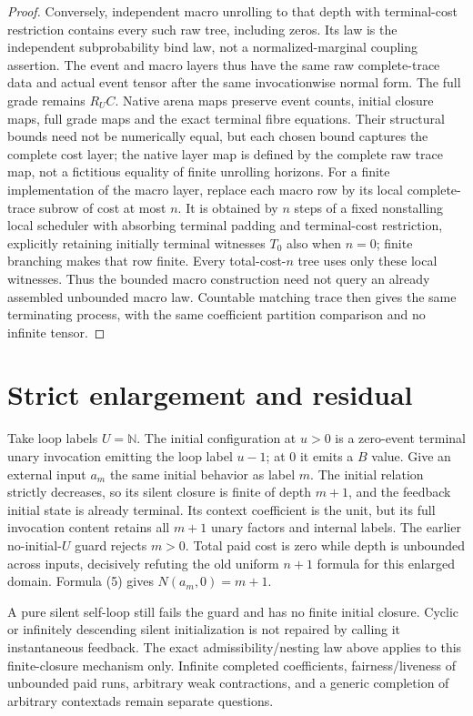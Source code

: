 \documentclass[11pt]{article}
\begin{document}
\begin{proof}
Conversely, independent macro unrolling to that depth with terminal-cost restriction contains every such raw tree, including zeros. Its law is the independent subprobability bind law, not a normalized-marginal coupling assertion. The event and macro layers thus have the same raw complete-trace data and actual event tensor after the same invocationwise normal form. The full grade remains $R_UC$. Native arena maps preserve event counts, initial closure maps, full grade maps and the exact terminal fibre equations. Their structural bounds need not be numerically equal, but each chosen bound captures the complete cost layer; the native layer map is defined by the complete raw trace map, not a fictitious equality of finite unrolling horizons. For a finite implementation of the macro layer, replace each macro row by its local complete-trace subrow of cost at most $n$. It is obtained by $n$ steps of a fixed nonstalling local scheduler with absorbing terminal padding and terminal-cost restriction, explicitly retaining initially terminal witnesses $T_0$ also when $n=0$; finite branching makes that row finite. Every total-cost-$n$ tree uses only these local witnesses. Thus the bounded macro construction need not query an already assembled unbounded macro law. Countable matching trace then gives the same terminating process, with the same coefficient partition comparison and no infinite tensor.
\end{proof}

\section{Strict enlargement and residual}
Take loop labels $U=\mathbb N$. The initial configuration at $u>0$ is a zero-event terminal unary invocation emitting the loop label $u-1$; at $0$ it emits a $B$ value. Give an external input $a_m$ the same initial behavior as label $m$. The initial relation strictly decreases, so its silent closure is finite of depth $m+1$, and the feedback initial state is already terminal. Its context coefficient is the unit, but its full invocation content retains all $m+1$ unary factors and internal labels. The earlier no-initial-$U$ guard rejects $m>0$. Total paid cost is zero while depth is unbounded across inputs, decisively refuting the old uniform $n+1$ formula for this enlarged domain. Formula (5) gives $N(a_m,0)=m+1$.

A pure silent self-loop still fails the guard and has no finite initial closure. Cyclic or infinitely descending silent initialization is not repaired by calling it instantaneous feedback. The exact admissibility/nesting law above applies to this finite-closure mechanism only. Infinite completed coefficients, fairness/liveness of unbounded paid runs, arbitrary weak contractions, and a generic completion of arbitrary contextads remain separate questions.
\end{document}
